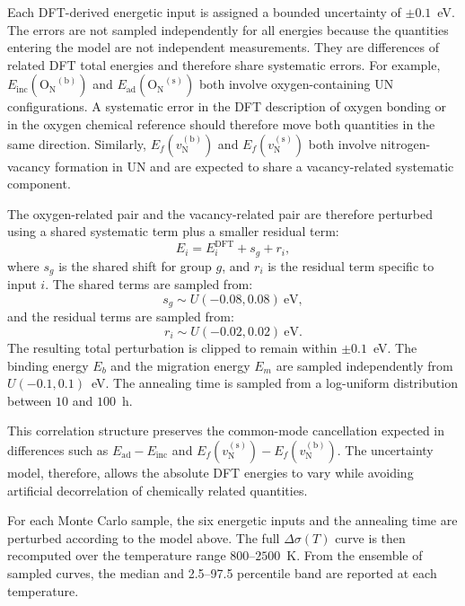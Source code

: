 \documentclass[preprint,12pt,sort&compress]{elsarticle}
\newcommand{\?}{\stackrel{?}{=}}
\begin{document}
Each DFT-derived energetic input is assigned a bounded uncertainty of $\pm0.1$~eV. The errors are not sampled independently for all energies because the quantities entering the model are not independent measurements. They are differences of related DFT total energies and therefore share systematic errors. For example, $E_\mathrm{inc}(\mathrm{O_N}^{(\mathrm{b})})$ and $E_\mathrm{ad}(\mathrm{O_N}^{(\mathrm{s})})$ both involve oxygen-containing UN configurations. A systematic error in the DFT description of oxygen bonding or in the oxygen chemical reference should therefore move both quantities in the same direction. Similarly, $E_f(v_\mathrm{N}^{(\mathrm{b})})$ and $E_f(v_\mathrm{N}^{(\mathrm{s})})$ both involve nitrogen-vacancy formation in UN and are expected to share a vacancy-related systematic component.

The oxygen-related pair and the vacancy-related pair are therefore perturbed using a shared systematic term plus a smaller residual term:
\begin{equation}
E_i = E_i^\mathrm{DFT} + s_g + r_i,
\label{Eq:App:UQ:errormodel}
\end{equation}
where $s_g$ is the shared shift for group $g$, and $r_i$ is the residual term specific to input $i$. The shared terms are sampled from:
\begin{equation}
s_g \sim U(-0.08,0.08)~\mathrm{eV},
\end{equation}
and the residual terms are sampled from:
\begin{equation}
r_i \sim U(-0.02,0.02)~\mathrm{eV}.
\end{equation}
The resulting total perturbation is clipped to remain within $\pm0.1$~eV. The binding energy $E_b$ and the migration energy $E_m$ are sampled independently from $U(-0.1,0.1)$~eV. The annealing time is sampled from a log-uniform distribution between $10$ and $100$~h.

This correlation structure preserves the common-mode cancellation expected in differences such as $E_\mathrm{ad}-E_\mathrm{inc}$ and $E_f(v_\mathrm{N}^{(\mathrm{s})})-E_f(v_\mathrm{N}^{(\mathrm{b})})$. The uncertainty model, therefore, allows the absolute DFT energies to vary while avoiding artificial decorrelation of chemically related quantities.

For each Monte Carlo sample, the six energetic inputs and the annealing time are perturbed according to the model above. The full $\Delta\sigma(T)$ curve is then recomputed over the temperature range $800$--$2500$~K. From the ensemble of sampled curves, the median and 2.5--97.5 percentile band are reported at each temperature.
\end{document}
